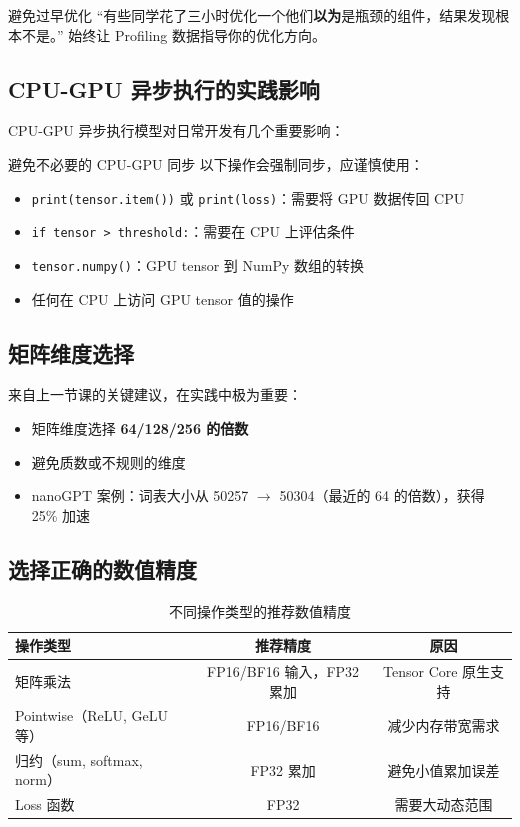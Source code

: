 \documentclass[a4paper]{article}
\begin{document}
\begin{warningbox}{避免过早优化}
``有些同学花了三小时优化一个他们\textbf{以为}是瓶颈的组件，结果发现根本不是。'' 始终让 Profiling 数据指导你的优化方向。
\end{warningbox}

\subsection{CPU-GPU 异步执行的实践影响}

CPU-GPU 异步执行模型对日常开发有几个重要影响：

\begin{importantbox}{避免不必要的 CPU-GPU 同步}
以下操作会强制同步，应谨慎使用：
\begin{itemize}
    \item \texttt{print(tensor.item())} 或 \texttt{print(loss)}：需要将 GPU 数据传回 CPU
    \item \texttt{if tensor > threshold:}：需要在 CPU 上评估条件
    \item \texttt{tensor.numpy()}：GPU tensor 到 NumPy 数组的转换
    \item 任何在 CPU 上访问 GPU tensor 值的操作
\end{itemize}
\end{importantbox}

\subsection{矩阵维度选择}

来自上一节课的关键建议，在实践中极为重要：
\begin{itemize}
    \item 矩阵维度选择 \textbf{64/128/256 的倍数}
    \item 避免质数或不规则的维度
    \item nanoGPT 案例：词表大小从 50257 $\rightarrow$ 50304（最近的 64 的倍数），获得 25\% 加速
\end{itemize}

\subsection{选择正确的数值精度}

\begin{table}[H]
\centering
\begin{tabular}{lcc}
\toprule
\textbf{操作类型} & \textbf{推荐精度} & \textbf{原因} \\
\midrule
矩阵乘法 & FP16/BF16 输入，FP32 累加 & Tensor Core 原生支持 \\
Pointwise（ReLU, GeLU 等） & FP16/BF16 & 减少内存带宽需求 \\
归约（sum, softmax, norm） & FP32 累加 & 避免小值累加误差 \\
Loss 函数 & FP32 & 需要大动态范围 \\
\bottomrule
\end{tabular}
\caption{不同操作类型的推荐数值精度}
\end{table}
\end{document}
